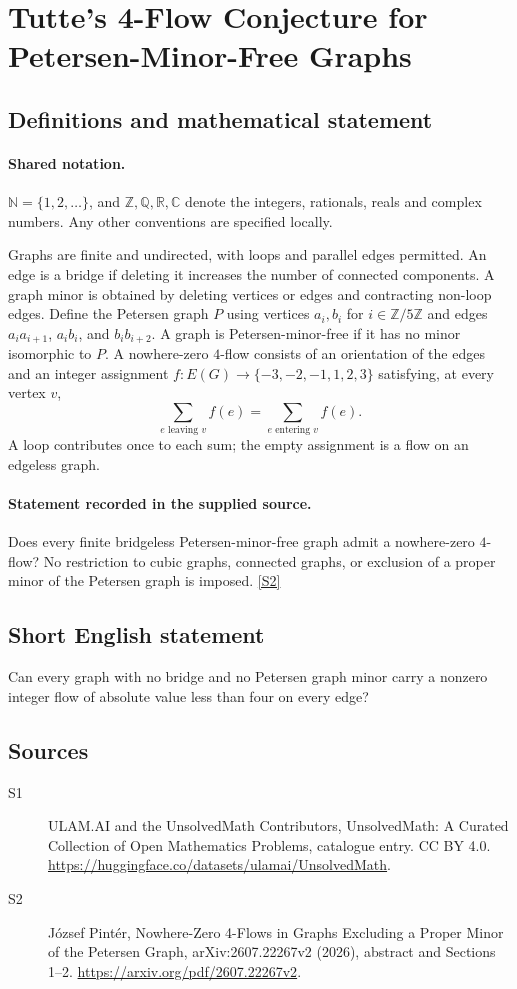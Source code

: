 \documentclass[11pt]{article}
\newcommand{\sref}[2]{\hyperlink{source:#1:#2}{[S#2]}}
\begin{document}
\section{Tutte's 4-Flow Conjecture for Petersen-Minor-Free Graphs}\label{statement}

\subsection{Definitions and mathematical statement}

\paragraph{Shared notation.}$\mathbb N=\{1,2,\ldots\}$, and $\mathbb Z,\mathbb Q,\mathbb R,\mathbb C$ denote the integers, rationals, reals and complex numbers. Any other conventions are specified locally.


Graphs are finite and undirected, with loops and parallel edges permitted. An edge is a bridge if deleting it increases the number of connected components. A graph minor is obtained by deleting vertices or edges and contracting non-loop edges. Define the Petersen graph $P$ using vertices $a_i,b_i$ for $i\in\mathbb Z/5\mathbb Z$ and edges $a_ia_{i+1}$, $a_ib_i$, and $b_ib_{i+2}$. A graph is Petersen-minor-free if it has no minor isomorphic to $P$. A nowhere-zero $4$-flow consists of an orientation of the edges and an integer assignment $f:E(G)\to\{-3,-2,-1,1,2,3\}$ satisfying, at every vertex $v$,
\[
 \sum_{e\text{ leaving }v}f(e)=\sum_{e\text{ entering }v}f(e).
\]
A loop contributes once to each sum; the empty assignment is a flow on an edgeless graph.
\paragraph{Statement recorded in the supplied source.}
Does every finite bridgeless Petersen-minor-free graph admit a nowhere-zero $4$-flow? No restriction to cubic graphs, connected graphs, or exclusion of a proper minor of the Petersen graph is imposed. \sref{statement}{2}
\subsection{Short English statement}
Can every graph with no bridge and no Petersen graph minor carry a nonzero integer flow of absolute value less than four on every edge?
\subsection{Sources}
\begin{description}
\item[\hypertarget{source:statement:1}{S1}] ULAM.AI and the UnsolvedMath Contributors, UnsolvedMath: A Curated Collection of Open Mathematics Problems, catalogue entry. CC BY 4.0. \url{https://huggingface.co/datasets/ulamai/UnsolvedMath}.
\item[\hypertarget{source:statement:2}{S2}] József Pintér, Nowhere-Zero 4-Flows in Graphs Excluding a Proper Minor of the Petersen Graph, arXiv:2607.22267v2 (2026), abstract and Sections 1--2. \url{https://arxiv.org/pdf/2607.22267v2}.
\end{description}
\label{end:statement}
\end{document}
